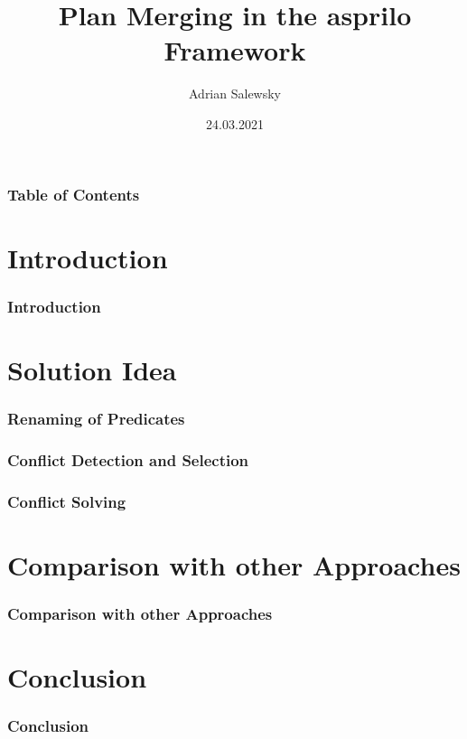 \documentclass{beamer}
\title{Plan Merging in the asprilo Framework}
\author[Adrian Salewsky]{Adrian Salewsky}
\institute{University of Potsdam}
\date{24.03.2021}
\begin{document}
\frame{\titlepage}

\begin{frame}
\frametitle{Table of Contents}
\tableofcontents
\end{frame}

\section{Introduction} 
\begin{frame}
\frametitle{Introduction}
\end{frame}

\section{Solution Idea}
\begin{frame}
\frametitle{Renaming of Predicates}
\end{frame}

\begin{frame}
\frametitle{Conflict Detection and Selection}
\end{frame}


\begin{frame}
\frametitle{Conflict Solving}
\end{frame}

\section{Comparison with other Approaches}
\begin{frame}
\frametitle{Comparison with other Approaches}
\end{frame}

\section{Conclusion}
\begin{frame}
\frametitle{Conclusion}
\end{frame}
\end{document}
